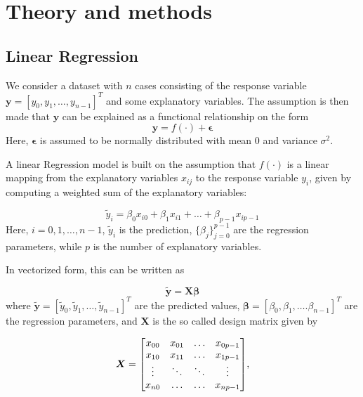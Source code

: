 \section{Theory and methods}
\label{sec:theory}

\subsection{Linear Regression}
We consider a dataset with $n$ cases consisting of the response variable $\boldsymbol{y}=[y_0,y_1,\ldots,y_{n-1}]^T$ and some explanatory variables. The assumption is then made that $\boldsymbol{y}$ can be explained as a functional relationship on the form
\begin{equation}\label{eq_model}
	\boldsymbol{y} = {f}(\cdot) + \boldsymbol{\epsilon} 
\end{equation} 
Here, $\boldsymbol{\epsilon}$ is assumed to be normally distributed with mean 0 and variance $\sigma^2$.  

A linear Regression model is built on the assumption that ${f}(\cdot)$ is a linear mapping from the explanatory variables $x_{ij}$ to the response variable $y_i$, given by computing a weighted sum of the explanatory variables:

\begin{equation*}
	\tilde{y}_i = \beta_0x_{i0} + \beta_1x_{i1} + \ldots + \beta_{p-1}x_{ip-1} 
\end{equation*}
Here, $i=0,1,\ldots ,n-1$, $\tilde{y}_i$ is the prediction, $\{\beta_j\}_{j=0}^{p-1}$ are the regression parameters, while $p$ is the number of explanatory variables. 

In vectorized form, this can be written as

\begin{equation*}
	\boldsymbol{\tilde{y}} = \boldsymbol{X}\boldsymbol{\beta}
\end{equation*}
where $\boldsymbol{\tilde{y}}=[\tilde{y}_0,\tilde{y}_1,\ldots, \tilde{y}_{n-1}]^T$ are the predicted values, $\boldsymbol{\beta}=[\beta_0, \beta_1, \ldots . \beta_{n-1}]^T$ are the regression parameters,  and $\boldsymbol{X}$ is the so called design matrix given by  

\[\boldsymbol{X} =
\mqty[x_{00} & x_{01} & \hdots & x_{0p-1} \\
x_{10} & x_{11} & \hdots & x_{1p-1} \\
\vdots & \ddots & \ddots &  \vdots \\
x_{n0} & \hdots & \hdots & x_{np-1}],
\]

